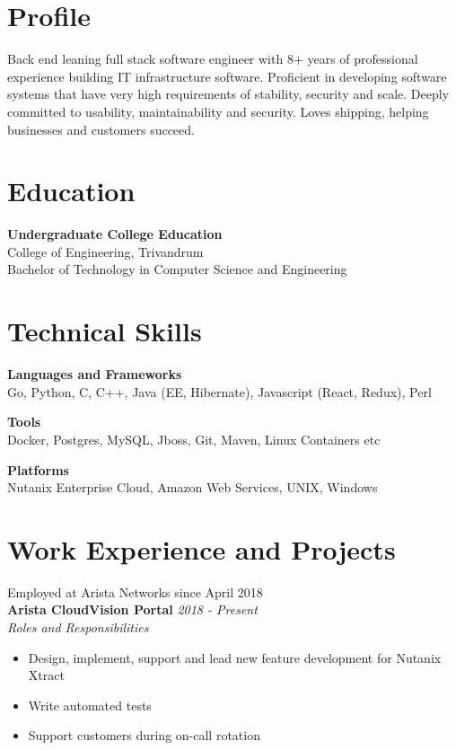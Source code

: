 \documentclass[line,margin]{res}
\begin{document}


\address{jojiantony@yandex.com}
\address{+91 96323 41954}

\begin{resume}

\section{Profile}
Back end leaning full stack software engineer with 8+ years of professional experience building IT infrastructure software. Proficient in developing software systems that have very high requirements of stability, security and scale. Deeply committed to usability, maintainability and security. Loves shipping, helping businesses and customers succeed.

\section{Education}
{\bf Undergraduate College Education}\\
College of Engineering, Trivandrum\\
Bachelor of Technology in Computer Science and Engineering\\

\section{Technical Skills}

{\bf Languages and Frameworks}\\
Go, Python, C, C++, Java (EE, Hibernate), Javascript (React, Redux), Perl

{\bf Tools}\\
Docker, Postgres, MySQL, Jboss, Git, Maven, Linux Containers etc

{\bf Platforms}\\
Nutanix Enterprise Cloud, Amazon Web Services, UNIX, Windows

\section{Work Experience and Projects}

Employed at Arista Networks since April 2018\\

{\bf Arista CloudVision Portal} \hfill {\it{2018 - Present}}\\

{\it{Roles and Responsibilities}}\\
\begin{itemize}
\item Design, implement, support and lead new feature development for Nutanix Xtract
\item Write automated tests
\item Support customers during on-call rotation
\end{itemize}


\end{resume}
\end{document}

